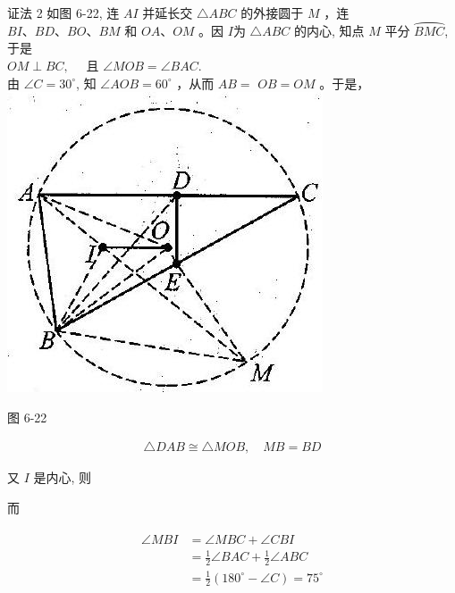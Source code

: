\documentclass[10pt]{article}
\begin{document}
证法 2 如图 6-22, 连 $A I$ 并延长交 $\triangle A B C$ 的外接圆于 $M$ ，连 $B I 、 B D 、 B O 、 B M$ 和 $O A 、 O M$ 。因 $I$为 $\triangle A B C$ 的内心, 知点 $M$ 平分 $\overparen{B M C}$, 于是\\
$O M \perp B C, \quad$ 且 $\angle M O B=\angle B A C$.\\
由 $\angle C=30^{\circ}$, 知 $\angle A O B=60^{\circ}$ ，从而 $A B=$ $O B=O M$ 。于是，\\
\includegraphics[max width=\textwidth, center]{2024_10_30_2c8f45efd4a519b08e1ag-072}

图 6-22

\begin{align*}
\triangle D A B \cong \triangle M O B, \quad M B=B D
\end{align*}

又 $I$ 是内心, 则

而

\begin{align*}
\begin{aligned}
\angle M B I & =\angle M B C+\angle C B I \\
& =\frac{1}{2} \angle B A C+\frac{1}{2} \angle A B C \\
& =\frac{1}{2}\left(180^{\circ}-\angle C\right)=75^{\circ}
\end{aligned}
\end{align*}
\end{document}
